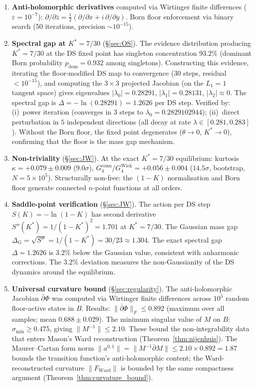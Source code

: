 \documentclass[11pt,a4paper]{article}
\theoremstyle{definition}
\theoremstyle{remark}
\newcommand{\dbar}{\bar{\partial}}
\begin{document}
\begin{enumerate}[nosep]
\item \textbf{Anti-holomorphic derivatives} computed via Wirtinger finite differences ($\varepsilon=10^{-7}$): $\partial/\partial\bar{z}=\frac{1}{2}(\partial/\partial x+i\,\partial/\partial y)$. Born floor enforcement via binary search (50 iterations, precision $\sim 10^{-15}$).

\item \textbf{Spectral gap at $K^*=7/30$} (\S\ref{sec:OS}). The evidence distribution producing $K^*=7/30$ at the DS fixed point has singleton concentration $93.2\%$ (dominant Born probability $p_{\mathrm{dom}}=0.932$ among singletons). Constructing this evidence, iterating the floor-modified DS map to convergence ($30$ steps, residual $<10^{-15}$), and computing the $3\times 3$ projected Jacobian (on the $L_1=1$ tangent space) gives eigenvalues $|\lambda_0|=0.28291$, $|\lambda_1|=0.28131$, $|\lambda_2|\approx 0$. The spectral gap is $\Delta=-\ln(0.28291)=1.2626$ per DS step. Verified by: (i)~power iteration (converges in $3$ steps to $\lambda_0=0.2829102944$); (ii)~direct perturbation in $5$ independent directions (all decay at rate $\lambda\in[0.281,0.283]$). Without the Born floor, the fixed point degenerates ($\theta\to 0$, $K^*\to 0$), confirming that the floor is the mass gap mechanism.

\item \textbf{Non-triviality} (\S\ref{sec:JW}). At the exact $K^*=7/30$ equilibrium: kurtosis $\kappa=+0.079\pm 0.009$ ($9.0\sigma$), $G_4^{\mathrm{conn}}/G_4^{\mathrm{Wick}}=+0.056\pm 0.004$ ($14.5\sigma$, bootstrap, $N=5\times 10^5$). Structurally non-free: the $(1\!-\!K)$ normalisation and Born floor generate connected $n$-point functions at all orders.

\item \textbf{Saddle-point verification} (\S\ref{sec:JW}). The action per DS step $S(K)=-\ln(1-K)$ has second derivative $S''(K^*)=1/(1-K^*)^2=1.701$ at $K^*=7/30$. The Gaussian mass gap $\Delta_{\mathrm{G}}=\sqrt{S''}=1/(1-K^*)=30/23\approx 1.304$. The exact spectral gap $\Delta=1.2626$ is $3.2\%$ below the Gaussian value, consistent with anharmonic corrections. The $3.2\%$ deviation measures the non-Gaussianity of the DS dynamics around the equilibrium.

\item \textbf{Universal curvature bound} (\S\ref{sec:regularity}). The anti-holomorphic Jacobian $\dbar\Phi$ was computed via Wirtinger finite differences across $10^5$ random floor-active states in $B$. Results: $\|\dbar\Phi\|_F\leq 0.892$ (maximum over all samples; mean $0.688\pm 0.029$). The minimum singular value of $M$ on $B$: $\sigma_{\min}\geq 0.475$, giving $\|M^{-1}\|\leq 2.10$. These bound the non-integrability data that enters Mason's Ward reconstruction (Theorem~\ref{thm:nijenhuis}). The Maurer--Cartan form norm $\|a^{0,1}\|=\|M^{-1}\dbar M\|\leq 2.10\times 0.892=1.87$ bounds the transition function's anti-holomorphic content; the Ward-reconstructed curvature $\|F_{\mathrm{Ward}}\|$ is bounded by the same compactness argument (Theorem~\ref{thm:curvature_bound}).


\end{enumerate}
\end{document}
